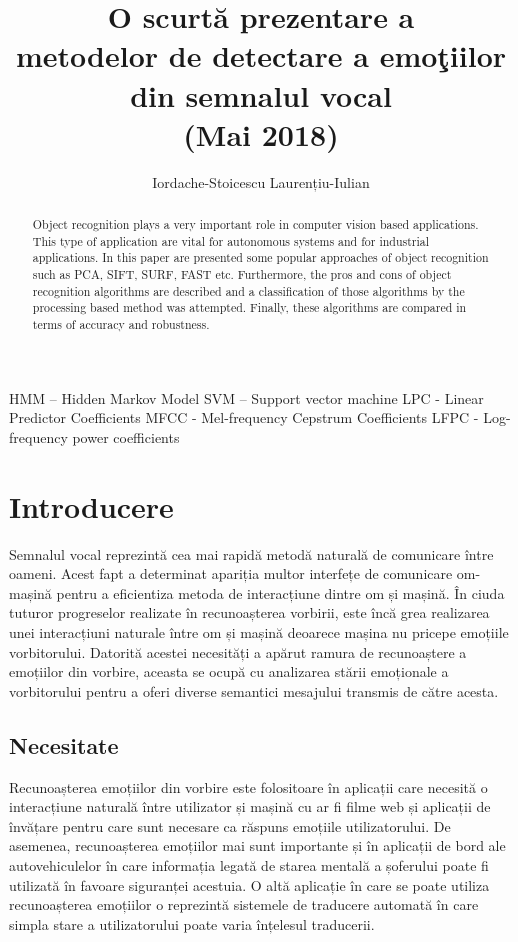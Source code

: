 \documentclass[9pt,shortpaper,twoside,web]{ieeecolor}
\begin{document}
\title{
O scurtă prezentare a \\
metodelor de detectare a emoţiilor din semnalul vocal  \\ 
(Mai 2018)}
\author{Iordache-Stoicescu Laurențiu-Iulian}

\maketitle


\begin{abstract}
Object recognition plays a very important role in computer vision based applications. This type of application 
are vital for autonomous systems and for industrial applications. In this paper are presented some popular approaches 
of object recognition such as PCA, SIFT, SURF, FAST etc. Furthermore, the pros and cons of object recognition algorithms 
are described and a classification of those algorithms by the processing based method was attempted. Finally, these 
algorithms are compared in terms of accuracy and robustness.
\end{abstract}

\begin{IEEEkeywords}
HMM – Hidden Markov Model
SVM – Support vector machine
LPC - Linear Predictor Coefficients
MFCC - Mel-frequency Cepstrum Coefficients
LFPC -  Log-frequency power coefficients
\end{IEEEkeywords}


\section{Introducere}
\label{sec:introduction}
Semnalul vocal reprezintă cea mai rapidă metodă naturală de comunicare între oameni. Acest fapt a determinat apariția multor interfețe de comunicare om-mașină pentru a eficientiza metoda de interacțiune dintre om și mașină. În ciuda tuturor progreselor realizate în recunoașterea vorbirii, este încă grea realizarea unei interacțiuni naturale între om și mașină deoarece mașina nu pricepe emoțiile vorbitorului. Datorită acestei necesități a apărut ramura de recunoaștere a emoțiilor din vorbire, aceasta se ocupă cu analizarea stării emoționale a vorbitorului pentru a oferi diverse semantici mesajului transmis de către acesta.


\subsection{Necesitate}
Recunoașterea emoțiilor din vorbire este folositoare în aplicații care necesită o interacțiune naturală între utilizator și mașină cu ar fi filme web și aplicații de învățare pentru care sunt necesare ca răspuns emoțiile utilizatorului. De asemenea, recunoașterea emoțiilor mai sunt importante și în aplicații de bord ale autovehiculelor în care informația legată de starea mentală a șoferului poate fi utilizată în favoare siguranței acestuia. O altă aplicație în care se poate utiliza recunoașterea emoțiilor o reprezintă sistemele de traducere automată în care simpla stare a utilizatorului poate varia înțelesul traducerii.
\end{document}
